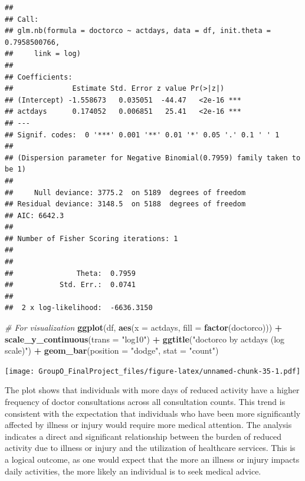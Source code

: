 \documentclass[
]{article}
\newenvironment{Shaded}{\begin{snugshade}}{\end{snugshade}}
\newcommand{\AttributeTok}[1]{\textcolor[rgb]{0.13,0.29,0.53}{#1}}
\newcommand{\CommentTok}[1]{\textcolor[rgb]{0.56,0.35,0.01}{\textit{#1}}}
\newcommand{\FunctionTok}[1]{\textcolor[rgb]{0.13,0.29,0.53}{\textbf{#1}}}
\newcommand{\NormalTok}[1]{#1}
\newcommand{\SpecialCharTok}[1]{\textcolor[rgb]{0.81,0.36,0.00}{\textbf{#1}}}
\newcommand{\StringTok}[1]{\textcolor[rgb]{0.31,0.60,0.02}{#1}}
\begin{document}
\begin{verbatim}
## 
## Call:
## glm.nb(formula = doctorco ~ actdays, data = df, init.theta = 0.7958500766, 
##     link = log)
## 
## Coefficients:
##              Estimate Std. Error z value Pr(>|z|)    
## (Intercept) -1.558673   0.035051  -44.47   <2e-16 ***
## actdays      0.174052   0.006851   25.41   <2e-16 ***
## ---
## Signif. codes:  0 '***' 0.001 '**' 0.01 '*' 0.05 '.' 0.1 ' ' 1
## 
## (Dispersion parameter for Negative Binomial(0.7959) family taken to be 1)
## 
##     Null deviance: 3775.2  on 5189  degrees of freedom
## Residual deviance: 3148.5  on 5188  degrees of freedom
## AIC: 6642.3
## 
## Number of Fisher Scoring iterations: 1
## 
## 
##               Theta:  0.7959 
##           Std. Err.:  0.0741 
## 
##  2 x log-likelihood:  -6636.3150
\end{verbatim}

\begin{Shaded}
\begin{Highlighting}[]
\CommentTok{\# For visualization}
\FunctionTok{ggplot}\NormalTok{(df, }\FunctionTok{aes}\NormalTok{(}\AttributeTok{x =}\NormalTok{ actdays, }\AttributeTok{fill =} \FunctionTok{factor}\NormalTok{(doctorco))) }\SpecialCharTok{+} 
  \FunctionTok{scale\_y\_continuous}\NormalTok{(}\AttributeTok{trans =} \StringTok{"log10"}\NormalTok{) }\SpecialCharTok{+}
  \FunctionTok{ggtitle}\NormalTok{(}\StringTok{"\textquotesingle{}doctorco\textquotesingle{} by \textquotesingle{}actdays\textquotesingle{} (log scale)"}\NormalTok{) }\SpecialCharTok{+}
  \FunctionTok{geom\_bar}\NormalTok{(}\AttributeTok{position =} \StringTok{"dodge"}\NormalTok{, }\AttributeTok{stat =} \StringTok{"count"}\NormalTok{)}
\end{Highlighting}
\end{Shaded}

\texttt{[image: GroupO\_FinalProject\_files/figure-latex/unnamed-chunk-35-1.pdf]}

The plot shows that individuals with more days of reduced activity have
a higher frequency of doctor consultations across all consultation
counts. This trend is consistent with the expectation that individuals
who have been more significantly affected by illness or injury would
require more medical attention. The analysis indicates a direct and
significant relationship between the burden of reduced activity due to
illness or injury and the utilization of healthcare services. This is a
logical outcome, as one would expect that the more an illness or injury
impacts daily activities, the more likely an individual is to seek
medical advice.
\end{document}
